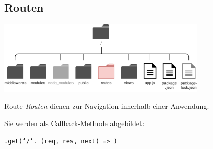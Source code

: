 \subsection{Routen}

\begin{center}
    \includegraphics[width=0.75\textwidth]{includes/figures/bonus_nodejs_routes.pdf}
\end{center}

\begin{defi}{Route}
    \emph{Routen} dienen zur Navigation innerhalb einer Anwendung.

    Sie werden als Callback-Methode abgebildet:

    \begin{center}
        \texttt{.get('/'. (req, res, next) => {})}
    \end{center}


\end{defi}
